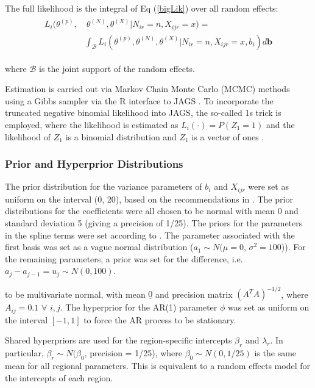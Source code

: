 \documentclass[10pt,letterpaper]{article}
\begin{document}
The full likelihood is the integral of Eq (\ref{bigLik}) over all
random effects: \begin{align}
\begin{split}
L_i(\theta^{(p)}, &~ \theta^{(N)}, \theta^{(X)} | N_{ir}=n, X_{ijr} = x) =\\& \int_\mathcal{B}L_i(\theta^{(p)}, \theta^{(N)}, \theta^{(X)} | N_{ir}=n, X_{ijr} = x, b_i)d\mathbf{b}
\end{split}\end{align}

\noindent where \(\mathcal{B}\) is the joint support of the random effects.

Estimation is carried out via Markov Chain Monte Carlo (MCMC) methods
using a Gibbs sampler via the R interface to JAGS
\cite{rcoreteamLanguageEnvironmentStatistical2019,plummerJAGSProgramAnalysis2003}. To incorporate the truncated
negative binomial likelihood into JAGS, the so-called 1s trick is
employed, where the likelihood is estimated as
\(L_i(\cdot) = P(Z_{1} = 1)\) and the likelihood of \(Z_1\) is a
binomial distribution and \(Z_1\) is a vector of ones \cite{kruschkeDoingBayesianData2015}.

\hypertarget{prior-and-hyperprior-distributions}{%
\subsubsection{Prior and Hyperprior
Distributions}\label{prior-and-hyperprior-distributions}}

The prior distribution for the variance parameters of \(b_i\) and
\(X_{ijr}\) were set as uniform on the interval (0, 20), based on the
recommendations in \cite{gelmanPriorDistributionsVariance2006}. The
prior distributions for the coefficients were all chosen to be normal
with mean 0 and standard deviation 5 (giving a precision of 1/25). The
priors for the parameters in the spline terms were set according to \cite{langBayesianPSplines2004}. The parameter associated with the first basis was set as a vague normal distribution ($a_1 \sim N(\mu = 0$, $\sigma^2 = 100$)). For the remaining parameters, a prior was set for the difference, i.e. $a_j - a_{j-1} = u_j \sim N(0, 100)$.

to be multivariate normal, with
mean \(\underline 0\) and precision matrix \((A^TA)^{-1/2}\), where
\(A_{ij} = 0.1\) \(\forall\) \(i,j\). The hyperprior for the AR(1)
parameter \(\phi\) was set as uniform on the interval \([-1,1]\) to
force the AR process to be stationary.

Shared hyperpriors are used for the region-specific intercepts
\(\beta_r\) and \(\lambda_r\). In particular,
\(\beta_r \sim N(\beta_0\), precision = 1/25), where
\(\beta_0 \sim N(0,1/25)\) is the same mean for all regional parameters.
This is equivalent to a random effects model for the intercepts of each
region.
\end{document}
